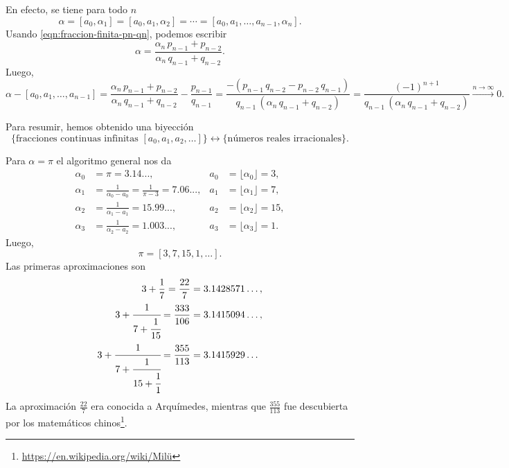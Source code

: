 En efecto, se tiene para todo $n$
$$\alpha = [a_0, \alpha_1] = [a_0, a_1, \alpha_2] = \cdots = [a_0, a_1, \ldots, a_{n-1}, \alpha_n].$$
Usando \eqref{eqn:fraccion-finita-pn-qn}, podemos escribir
$$\alpha = \frac{\alpha_n \, p_{n-1} + p_{n-2}}{\alpha_n \, q_{n-1} + q_{n-2}}.$$
Luego,
\[ \alpha - [a_0,a_1,\ldots,a_{n-1}] =
   \frac{\alpha_n \, p_{n-1} + p_{n-2}}{\alpha_n \, q_{n-1} + q_{n-2}} - \frac{p_{n-1}}{q_{n-1}} =
   \frac{-(p_{n-1}\, q_{n-2} - p_{n-2} \, q_{n-1})}{q_{n-1} \, (\alpha_n \, q_{n-1} + q_{n-2})} =
   \frac{(-1)^{n+1}}{q_{n-1} \, (\alpha_n \, q_{n-1} + q_{n-2})} \xrightarrow{n\to\infty} 0. \]

Para resumir, hemos obtenido una biyección
\[ \{ \text{fracciones continuas infinitas }[a_0,a_1,a_2,\ldots] \}
   \leftrightarrow
   \{ \text{números reales irracionales} \}. \]

\begin{ejemplo}
  Para $\alpha = \pi$ el algoritmo general nos da
  \begin{align*}
    \alpha_0 & = \pi = 3.14..., & a_0 & = \lfloor \alpha_0\rfloor = 3,\\
    \alpha_1 & = \frac{1}{\alpha_0 - a_0} = \frac{1}{\pi-3} = 7.06..., & a_1 & = \lfloor \alpha_1\rfloor = 7,\\
    \alpha_2 & = \frac{1}{\alpha_1 - a_1} =  15.99..., & a_2 & = \lfloor \alpha_2\rfloor = 15,\\
    \alpha_3 & = \frac{1}{\alpha_2 - a_2} =  1.003..., & a_3 & = \lfloor \alpha_3\rfloor = 1.
  \end{align*}
  Luego,
  $$\pi = [3,7,15,1,\ldots].$$
  Las primeras aproximaciones son
  \begin{align*}
    3 + \frac{1}{7}                                 = \frac{22}{7}    & = 3.1428571\ldots,\\
    3 + \cfrac{1}{7 + \cfrac{1}{15}}                = \frac{333}{106} & = 3.1415094\ldots,\\
    3 + \cfrac{1}{7 + \cfrac{1}{15 + \cfrac{1}{1}}} = \frac{355}{113} & = 3.1415929\ldots
  \end{align*}
  La aproximación $\frac{22}{7}$ era conocida a Arquímedes, mientras que
  $\frac{355}{113}$ fue descubierta por los matemáticos
  chinos\footnote{\url{https://en.wikipedia.org/wiki/Milü}}.
\end{ejemplo}

